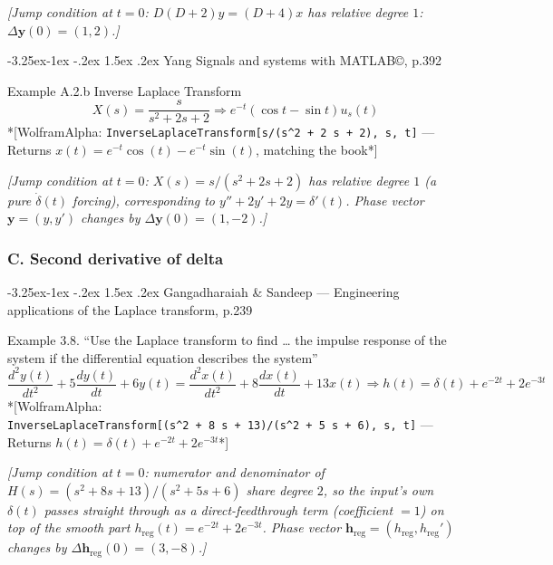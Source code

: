 \documentclass[
  11pt,
]{article}
\makeatletter
\providecommand{\implies}{\Longrightarrow}
\renewcommand\paragraph{\@startsection{paragraph}{4}{\z@}%
                                     {-3.25ex\@plus -1ex \@minus -.2ex}%
                                     {1.5ex \@plus .2ex}%
                                     {\normalfont\normalsize\bfseries}}
\makeatother
\begin{document}
\emph{{[}Jump condition at \(t=0\): \(D(D+2)y=(D+4)x\) has relative
degree \(1\): \(\Delta\mathbf y(0)=(1,2)\).{]}}

\hypertarget{yang-signals-and-systems-with-matlab-p.392}{%
\paragraph{Yang Signals and systems with MATLAB©,
p.392}\label{yang-signals-and-systems-with-matlab-p.392}}

Example A.2.b Inverse Laplace Transform \[X(s) = \frac{s}{s^2 + 2s + 2}
\implies e^{-t}(\cos t - \sin t)u_s(t)
\] *{[}WolframAlpha:
\texttt{InverseLaplaceTransform{[}s/(s\^{}2\ +\ 2\ s\ +\ 2),\ s,\ t{]}}
--- Returns \(x(t) = e^{-t}\cos(t) - e^{-t}\sin(t)\), matching the
book*{]}

\emph{{[}Jump condition at \(t=0\): \(X(s)=s/(s^2+2s+2)\) has relative
degree \(1\) (a pure \(\dot\delta(t)\) forcing), corresponding to
\(y''+2y'+2y=\delta'(t)\). Phase vector \(\mathbf y=(y,y')\) changes by
\(\Delta\mathbf y(0)=(1,-2)\).{]}}

\hypertarget{second-order-c-second-derivative}{%
\subsubsection{C. Second derivative of
delta}\label{second-order-c-second-derivative}}

\hypertarget{gangadharaiah-sandeep-engineering-applications-of-the-laplace-transform-p.239}{%
\paragraph{Gangadharaiah \& Sandeep --- Engineering applications of the
Laplace transform,
p.239}\label{gangadharaiah-sandeep-engineering-applications-of-the-laplace-transform-p.239}}

Example 3.8. ``Use the Laplace transform to find \ldots{} the impulse
response of the system if the differential equation describes the
system'' \[
\frac{d^2y(t)}{dt^2} + 5\frac{dy(t)}{dt} + 6y(t) = \frac{d^2x(t)}{dt^2} + 8\frac{dx(t)}{dt} + 13x(t) \implies h(t) = \delta(t) + e^{-2t} + 2e^{-3t}
\] *{[}WolframAlpha:
\texttt{InverseLaplaceTransform{[}(s\^{}2\ +\ 8\ s\ +\ 13)/(s\^{}2\ +\ 5\ s\ +\ 6),\ s,\ t{]}}
--- Returns \(h(t) = \delta(t) + e^{-2t} + 2 e^{-3t}\)*{]}

\emph{{[}Jump condition at \(t=0\): numerator and denominator of
\(H(s)=(s^2+8s+13)/(s^2+5s+6)\) share degree \(2\), so the input's own
\(\delta(t)\) passes straight through as a direct-feedthrough term
(coefficient \(=1\)) on top of the smooth part
\(h_{\text{reg}}(t)=e^{-2t}+2e^{-3t}\). Phase vector
\(\mathbf h_{\text{reg}}=(h_{\text{reg}},h_{\text{reg}}')\) changes by
\(\Delta\mathbf h_{\text{reg}}(0)=(3,-8)\).{]}}
\end{document}
